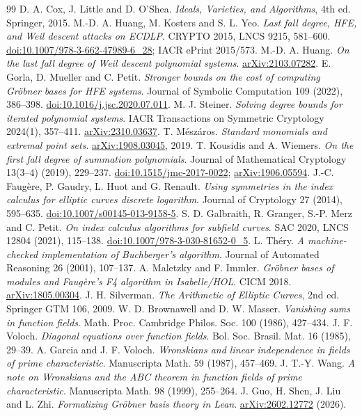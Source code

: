 \documentclass[11pt]{article}
\theoremstyle{definition}\newtheorem{definition}[theorem]{Definition}
\theoremstyle{remark}\newtheorem{remark}[theorem]{Remark}
\begin{document}
\begin{thebibliography}{99}
 D. A. Cox, J. Little and D. O'Shea.
\emph{Ideals, Varieties, and Algorithms}, 4th ed. Springer, 2015.
 M.-D. A. Huang, M. Kosters and S. L. Yeo.
\emph{Last fall degree, HFE, and Weil descent attacks on ECDLP}.
CRYPTO 2015, LNCS 9215, 581--600.
\href{https://doi.org/10.1007/978-3-662-47989-6_28}{doi:10.1007/978-3-662-47989-6\_28}; IACR ePrint 2015/573.
 M.-D. A. Huang.
\emph{On the last fall degree of Weil descent polynomial systems}.
\href{https://arxiv.org/abs/2103.07282}{arXiv:2103.07282}.
 E. Gorla, D. Mueller and C. Petit.
\emph{Stronger bounds on the cost of computing Gr\"obner bases for HFE systems}.
Journal of Symbolic Computation 109 (2022), 386--398.
\href{https://doi.org/10.1016/j.jsc.2020.07.011}{doi:10.1016/j.jsc.2020.07.011}.
 M. J. Steiner.
\emph{Solving degree bounds for iterated polynomial systems}.
IACR Transactions on Symmetric Cryptology 2024(1), 357--411.
\href{https://arxiv.org/abs/2310.03637}{arXiv:2310.03637}.
 T. M\'esz\'aros.
\emph{Standard monomials and extremal point sets}.
\href{https://arxiv.org/abs/1908.03045}{arXiv:1908.03045}, 2019.
 T. Kousidis and A. Wiemers.
\emph{On the first fall degree of summation polynomials}.
Journal of Mathematical Cryptology 13(3--4) (2019), 229--237.
\href{https://doi.org/10.1515/jmc-2017-0022}{doi:10.1515/jmc-2017-0022}; \href{https://arxiv.org/abs/1906.05594}{arXiv:1906.05594}.
 J.-C. Faug\`ere, P. Gaudry, L. Huot and G. Renault.
\emph{Using symmetries in the index calculus for elliptic curves discrete logarithm}.
Journal of Cryptology 27 (2014), 595--635.
\href{https://doi.org/10.1007/s00145-013-9158-5}{doi:10.1007/s00145-013-9158-5}.
 S. D. Galbraith, R. Granger, S.-P. Merz and C. Petit.
\emph{On index calculus algorithms for subfield curves}.
SAC 2020, LNCS 12804 (2021), 115--138.
\href{https://doi.org/10.1007/978-3-030-81652-0_5}{doi:10.1007/978-3-030-81652-0\_5}.
 L. Th\'ery.
\emph{A machine-checked implementation of Buchberger's algorithm}.
Journal of Automated Reasoning 26 (2001), 107--137.
 A. Maletzky and F. Immler.
\emph{Gr\"obner bases of modules and Faug\`ere's F4 algorithm in Isabelle/HOL}.
CICM 2018. \href{https://arxiv.org/abs/1805.00304}{arXiv:1805.00304}.
 J. H. Silverman.
\emph{The Arithmetic of Elliptic Curves}, 2nd ed. Springer GTM 106, 2009.
 W. D. Brownawell and D. W. Masser.
\emph{Vanishing sums in function fields}.
Math. Proc. Cambridge Philos. Soc. 100 (1986), 427--434.
 J. F. Voloch.
\emph{Diagonal equations over function fields}.
Bol. Soc. Brasil. Mat. 16 (1985), 29--39.
 A. Garcia and J. F. Voloch.
\emph{Wronskians and linear independence in fields of prime characteristic}.
Manuscripta Math. 59 (1987), 457--469.
 J. T.-Y. Wang.
\emph{A note on Wronskians and the ABC theorem in function fields of prime
characteristic}.
Manuscripta Math. 98 (1999), 255--264.
 J. Guo, H. Shen, J. Liu and L. Zhi.
\emph{Formalizing Gr\"obner basis theory in Lean}.
\href{https://arxiv.org/abs/2602.12772}{arXiv:2602.12772} (2026).
\end{thebibliography}
\end{document}
